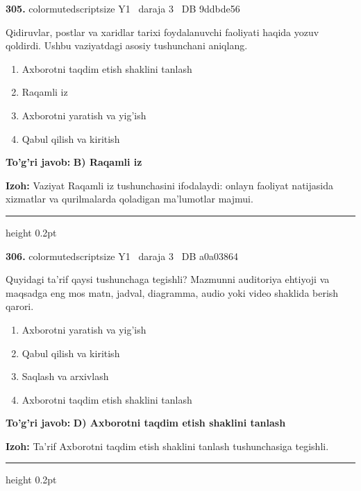 \documentclass[10pt,a4paper,oneside]{article}
\begin{document}
\noindent\textbf{\color{ink}305.}  {color{muted}scriptsize Y1 \textbullet\ daraja 3 \textbullet\ DB 9ddbde56}
\par
Qidiruvlar, postlar va xaridlar tarixi foydalanuvchi faoliyati haqida yozuv qoldirdi. Ushbu vaziyatdagi asosiy tushunchani aniqlang.
\begin{enumerate}[label=\Alph*),leftmargin=9mm]
\item Axborotni taqdim etish shaklini tanlash
\item Raqamli iz
\item Axborotni yaratish va yig'ish
\item Qabul qilish va kiritish
\end{enumerate}
\begin{tcolorbox}[enhanced,breakable,colback=teal!4,colframe=teal!50!black,boxrule=0.5pt,arc=1.1mm,left=3mm,right=3mm,top=1.7mm,bottom=1.7mm,before skip=2mm,after skip=2mm]
\textbf{\color{teal}To'g'ri javob:} \textbf{B) Raqamli iz}
\par\smallskip
\textbf{Izoh:} Vaziyat Raqamli iz tushunchasini ifodalaydi: onlayn faoliyat natijasida xizmatlar va qurilmalarda qoladigan ma'lumotlar majmui.
\end{tcolorbox}
\vspace{2mm}\hrule height 0.2pt \vspace{3mm}

\noindent\textbf{\color{ink}306.}  {color{muted}scriptsize Y1 \textbullet\ daraja 3 \textbullet\ DB a0a03864}
\par
Quyidagi ta'rif qaysi tushunchaga tegishli? Mazmunni auditoriya ehtiyoji va maqsadga eng mos matn, jadval, diagramma, audio yoki video shaklida berish qarori.
\begin{enumerate}[label=\Alph*),leftmargin=9mm]
\item Axborotni yaratish va yig'ish
\item Qabul qilish va kiritish
\item Saqlash va arxivlash
\item Axborotni taqdim etish shaklini tanlash
\end{enumerate}
\begin{tcolorbox}[enhanced,breakable,colback=teal!4,colframe=teal!50!black,boxrule=0.5pt,arc=1.1mm,left=3mm,right=3mm,top=1.7mm,bottom=1.7mm,before skip=2mm,after skip=2mm]
\textbf{\color{teal}To'g'ri javob:} \textbf{D) Axborotni taqdim etish shaklini tanlash}
\par\smallskip
\textbf{Izoh:} Ta'rif Axborotni taqdim etish shaklini tanlash tushunchasiga tegishli.
\end{tcolorbox}
\vspace{2mm}\hrule height 0.2pt \vspace{3mm}
\end{document}

